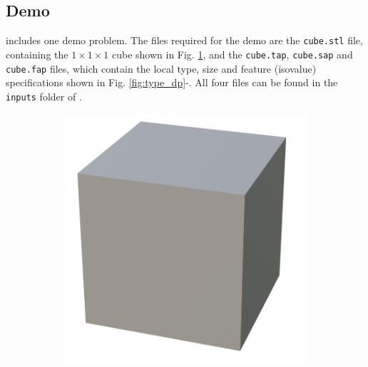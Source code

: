 \subsection{Demo} \label{sec:demo}
\asli{} includes one demo problem. The files required for the demo are the \texttt{cube.stl} file, containing the $1\times1\times1$ cube shown in Fig. \ref{fig:cube}, and the \texttt{cube.tap}, \texttt{cube.sap} and \texttt{cube.fap} files, which contain the local type, size and feature (isovalue) specifications shown in Fig. \ref{fig:type_dp}-. All four files can be found in the \texttt{inputs} folder of \asli{}.
\begin{figure}[htb]
	\centering
	\begin{subfigure}[t]{.225\textwidth}
		\centering
		\includegraphics[width=\linewidth]{figures/cube.png}
		\caption{}\label{fig:cube}
	\end{subfigure}\hspace{1.0em}%
	\begin{subfigure}[t]{.225\textwidth}
		\centering

\end{subfigure}
\end{figure}
